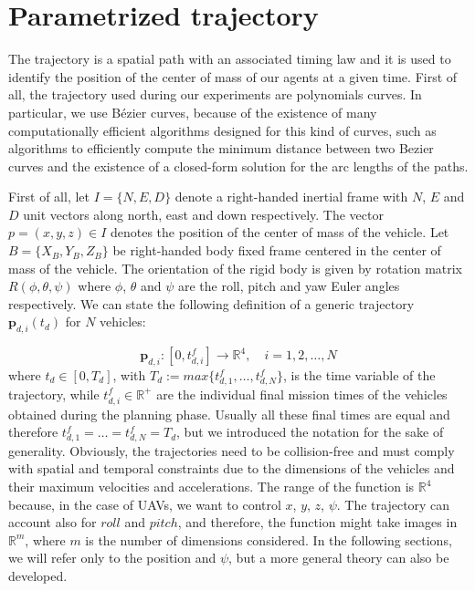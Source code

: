 \section{Parametrized trajectory\label{sec:parametrized_trajectory}}
The trajectory is a spatial path with an associated timing law and it is used
to identify the position of the center of mass of our agents at a given time.
First of all, the trajectory used during our experiments are polynomials curves.
In particular, we use Bézier curves, because of the existence of many
computationally efficient algorithms designed for this kind of curves,
such as algorithms to efficiently compute the minimum distance between two Bezier curves
and the existence of a closed-form solution for the arc lengths of the paths.

First of all, let $I = \{N, E, D\}$ denote a right-handed inertial frame with $N$, $E$ and $D$
unit vectors along north, east and down respectively.
The vector $p = (x, y, z) \in I$ denotes the position of the center of mass of the vehicle.
Let $B = \{X_B, Y_B, Z_B\}$ be right-handed body fixed frame centered in the center of mass of the vehicle.
The orientation of the rigid body is given by rotation matrix $R(\phi, \theta, \psi)$ where
$\phi$, $\theta$ and $\psi$ are the roll, pitch and yaw Euler angles respectively.
We can state the following definition of a generic trajectory $ \bm{p}_{d,i}(t_d) $
for $ N $ vehicles:

\begin{equation}  \label{eq:traj_def}
  \bm{p}_{d,i}:[0,t^f_{d,i}] \rightarrow \mathbb{R}^4, \quad i = 1,2,\dots,N
\end{equation}
where $ t_d \in [0, T_d] $, with $T_d := max \{ t^f_{d,1}, \dots , t^f_{d,N} \} $,
is the time variable of the trajectory, while $ t^f_{d,i} \in \mathbb{R}^+ $
are the individual final mission times of the vehicles obtained during the planning
phase. Usually all these final times are equal and therefore
$ t^f_{d,1} = \dots = t^f_{d,N} = T_d$, but we introduced the notation
for the sake of generality.
Obviously, the trajectories need to be collision-free and must comply with spatial
and temporal constraints due to the dimensions of the vehicles and their maximum
velocities and accelerations.
The range of the function is $\mathbb{R}^4$ because, in the case of UAVs, we want
to control $x$, $y$, $z$, $\psi$.
The trajectory can account also for $roll$ and $pitch$, and therefore, the function might take
images in $\mathbb{R}^m$, where $m$ is the number of dimensions considered.
In the following sections, we will refer only to the position and $\psi$, but a more general
theory can also be developed.

